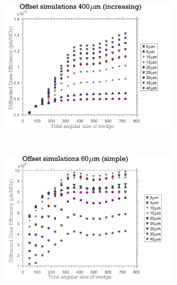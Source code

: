 \begin{figure}
    \ContinuedFloat
    \begin{subfigure}[b]{0.9\textwidth}
        \centering
        \includegraphics[width=\textwidth]{figures/dwd/OffsetSimulationDDMnewCrystSize400.pdf}
        \caption{}
        \label{fig:Offset simulations 400 - Increasing Eta}
    \end{subfigure}
    \\
    \begin{subfigure}[b]{0.9\textwidth}
        \centering
        \includegraphics[width=\textwidth]{figures/dwd/OffsetSimulationDDMsimpleCrystSize60.pdf}
        \caption{}
        \label{fig:Offset simulations 60 - Simple Eta}
    \end{subfigure}
\end{figure}
